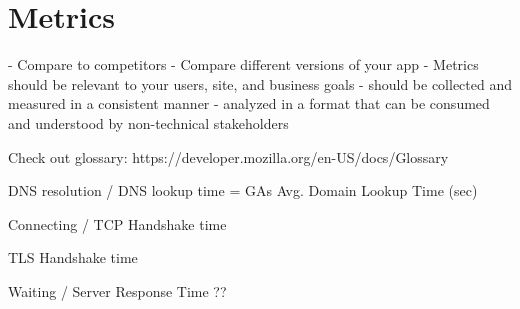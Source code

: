 \section{Metrics}
















- Compare to competitors
- Compare different versions of your app
- Metrics should be relevant to your users, site, and business goals
- should be collected and measured in a consistent manner
- analyzed in a format that can be consumed and understood by non-technical stakeholders





Check out glossary: https://developer.mozilla.org/en-US/docs/Glossary



DNS resolution / DNS lookup time %
= GAs Avg. Domain Lookup Time (sec) %


Connecting / TCP Handshake time %


TLS Handshake time %


Waiting / Server Response Time ?? %


